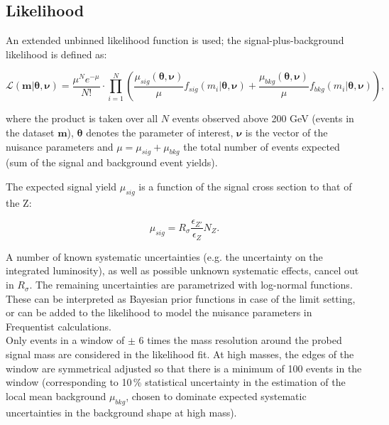 \subsection{Likelihood} 
An extended unbinned likelihood function is used;  the signal-plus-background likelihood is defined as: 

\begin{equation}
\label{eq:ext_likelihood}
\mathcal{L}(\mathbf{m}|\boldsymbol{\theta},\boldsymbol{\nu}) =
  \frac{\mu^Ne^{-\mu}}{N!} \cdot
    \prod_{i=1}^{N}
      \left(
        \frac{\mu_{sig}(\boldsymbol{\theta},\boldsymbol{\nu})}{\mu}f_{sig}(m_i|\boldsymbol{\theta},\boldsymbol{\nu})
        + \frac{\mu_{bkg}(\boldsymbol{\theta},\boldsymbol{\nu})}{\mu}f_{bkg}(m_i|\boldsymbol{\theta},\boldsymbol{\nu})
      \right), 
\end{equation}%

where the product is taken over all $N$ events observed above 200 GeV (events in the dataset $\mathbf{m}$), $\boldsymbol{\theta}$ denotes the parameter of interest, $\boldsymbol{\nu}$ is the vector of the nuisance parameters and $\mu=\mu_{sig}+\mu_{bkg}$ the total number of events expected (sum of the signal and background event yields).

The expected signal yield $\mu_{sig}$ is a function of the signal cross section to that of the Z:

\begin{equation}
\label{eq:signalParam}
\mu_{sig} = R_\sigma \frac{\epsilon_{Z'}}{\epsilon_{Z}} N_{Z}.
\end{equation}

A number of known systematic uncertainties (e.g. the uncertainty on the integrated luminosity), as well as possible unknown systematic effects, cancel out in $R_\sigma$. The remaining uncertainties are parametrized with log-normal functions. These can be interpreted as Bayesian prior functions in case of the limit setting, or can be added to the likelihood to model the nuisance parameters in Frequentist calculations. \\
Only events in a window of $\pm$ 6 times the mass resolution around the probed signal mass are considered in the likelihood fit. At high masses, the edges of the window are symmetrical adjusted so that there is a minimum of 100 events in the window (corresponding to 10\,\% statistical uncertainty in the estimation of the local mean background $\mu_{bkg}$, chosen to dominate expected systematic uncertainties in the background shape at high mass).

